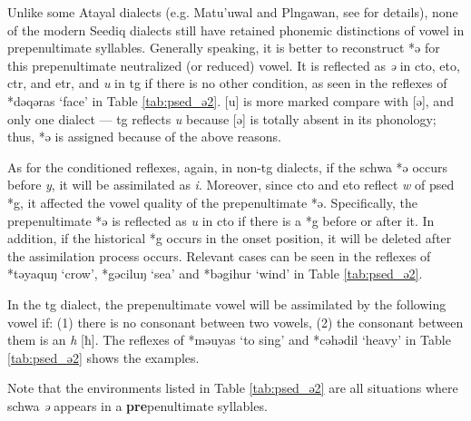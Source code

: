 Unlike some Atayal dialects (e.g. Matu'uwal and Plngawan, see \textcite{goderich2020phd} for details), none of the modern Seediq dialects still have retained phonemic distinctions of vowel in prepenultimate syllables. Generally speaking, it is better to reconstruct *ə for this prepenultimate neutralized (or reduced) vowel. It is reflected as \textit{ə} in \acl{cto}, \acl{eto}, \acl{ctr}, and \acl{etr}, and \textit{u} in \acl{tg} if there is no other condition, as seen in the reflexes of *dəqəras `face' in Table \ref{tab:psed_ə2}. [u] is more marked compare with [ə], and only one dialect --- \acl{tg} reflects \textit{u} because [ə] is totally absent in its phonology; thus, *ə is assigned because of the above reasons. 

As for the conditioned reflexes, again, in non-\acl{tg} dialects, if the schwa *ə occurs before \textit{y}, it will be assimilated as \textit{i}. Moreover, since \acl{cto} and \acl{eto} reflect \textit{w} of \acl{psed} *g, it affected the vowel quality of the prepenultimate *ə. Specifically, the prepenultimate *ə is reflected as \textit{u} in \acl{cto} if there is a *g before or after it. In addition, if the historical *g occurs in the onset position, it will be deleted after the assimilation process occurs. Relevant cases can be seen in the reflexes of *təyaquŋ `crow', *gəciluŋ `sea' and *bəgihur `wind' in Table \ref{tab:psed_ə2}. 

In the \acl{tg} dialect, the prepenultimate vowel will be assimilated by the following vowel if: (1) there is no consonant between two vowels, (2) the consonant between them is an \textit{h} [ħ]. The reflexes of *məuyas `to sing' and *cəhədil `heavy' in Table \ref{tab:psed_ə2} shows the examples. 

Note that the environments listed in Table \ref{tab:psed_ə2} are all situations where schwa \textit{ə} appears in a \textbf{pre}penultimate syllables.

